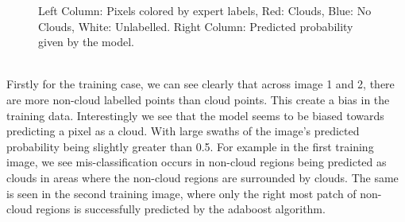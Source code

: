 \documentclass[11pt, letterpaper, journal]{IEEEtran}
\begin{document}
\begin{figure}%
    \centering
    \qquad
    \qquad
    \caption{Left Column: Pixels colored by expert labels, Red: Clouds, Blue: No Clouds, White: Unlabelled. Right Column: Predicted probability given by the model.}%
    \label{fig:Probability_Preds}%
\end{figure}
\\
Firstly for the training case, we can see clearly that across image 1 and 2, there are more non-cloud labelled points than cloud points. This create a bias in the training data. Interestingly we see that the model seems to be biased towards predicting a pixel as a cloud. With large swaths of the image's predicted probability being slightly greater than 0.5. For example in the first training image, we see mis-classification occurs in non-cloud regions being predicted as clouds in areas where the non-cloud regions are surrounded by clouds. The same is seen in the second training image, where only the right most patch of non-cloud regions is successfully predicted by the adaboost algorithm. 
\end{document}
